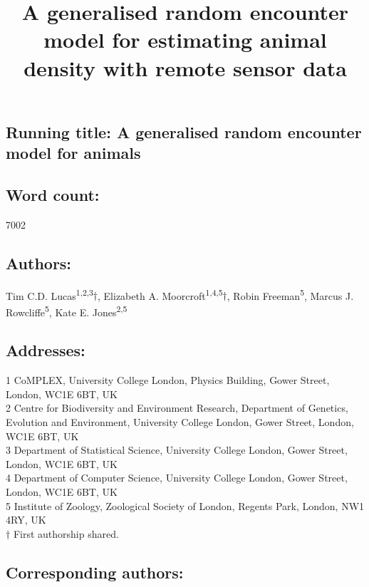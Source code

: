 \documentclass[a4paper,10pt,reqno,oneside]{amsart}
\begin{document}
\title[Lucas \emph{et al.}: A generalised random encounter model for animals]{A generalised random encounter model for estimating animal density with remote sensor data}
\maketitle

\subsection*{ Running title: A generalised random encounter model for animals}

\subsection*{ Word count:} 7002

\subsection*{ Authors:\\}
Tim C.D. Lucas\textsuperscript{1,2,3}$\dagger$, Elizabeth A. Moorcroft\textsuperscript{1,4,5}$\dagger$, Robin Freeman\textsuperscript{5}, Marcus J. Rowcliffe\textsuperscript{5}, Kate E. Jones\textsuperscript{2,5}


\subsection*{ Addresses:\\}
1 CoMPLEX, University College London, Physics Building, Gower Street, London, WC1E 6BT, UK\\ 
2 Centre for Biodiversity and Environment Research, Department of Genetics, Evolution and Environment, University College London, Gower Street, London, WC1E 6BT, UK\\ 
3 Department of Statistical Science, University College London, Gower Street, London, WC1E 6BT, UK\\ 
4 Department of Computer Science, University College London, Gower Street, London, WC1E 6BT, UK\\ 
5 Institute of Zoology, Zoological Society of London, Regents Park, London, NW1 4RY, UK\\
$\dagger$ First authorship shared. 

\subsection*{ Corresponding authors:\\}
\end{document}
